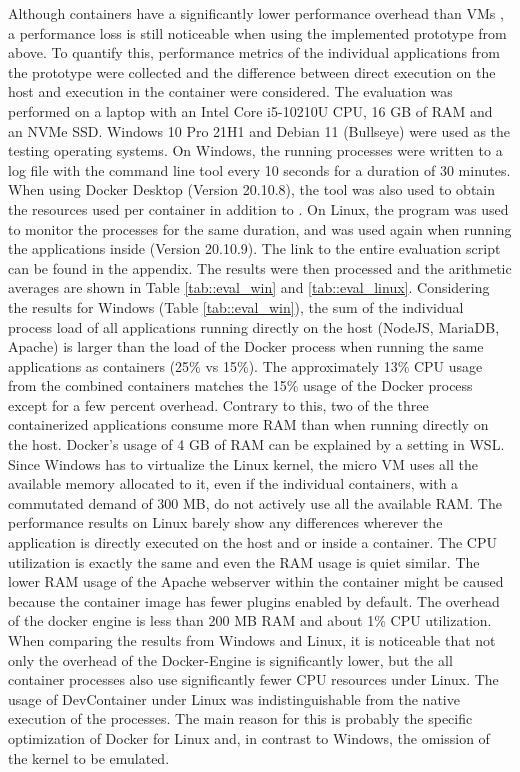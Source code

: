         Although containers have a significantly lower performance overhead than \ac{VM}s \cite{ieee_perfomance}, a performance loss is still noticeable when using the implemented prototype from above. To quantify this, performance metrics of the individual applications from the prototype were collected and the difference between direct execution on the host and execution in the container were considered.\newline
        The evaluation was performed on a laptop with an Intel Core i5-10210U CPU, 16 GB of RAM and an NVMe SSD. Windows 10 Pro 21H1 and Debian 11 (Bullseye) were used as the testing operating systems. On Windows, the running processes were written to a log file with the command line tool  every 10 seconds for a duration of 30 minutes. When using Docker Desktop (Version 20.10.8), the tool  was also used to obtain the resources used per container in addition to . On Linux, the  program was used to monitor the processes for the same duration, and  was used again when running the applications inside  (Version 20.10.9). The link to the entire evaluation script can be found in the appendix. The results were then processed and the arithmetic averages are shown in Table \ref{tab::eval_win} and \ref{tab::eval_linux}.\newline
        Considering the results for Windows (Table \ref{tab::eval_win}), the sum of the individual process load of all applications running directly on the host (NodeJS, MariaDB, Apache) is larger than the load of the Docker process when running the same applications as containers (25\% vs 15\%). The approximately 13\% CPU usage from the combined containers matches the 15\% usage of the Docker process except for a few percent overhead. Contrary to this, two of the three containerized applications consume more RAM than when running directly on the host. Docker's usage of 4 GB of RAM can be explained by a setting in \ac{WSL}. Since Windows has to virtualize the Linux kernel, the micro \ac{VM} uses all the available memory allocated to it, even if the individual containers, with a commutated demand of 300 MB, do not actively use all the available RAM.\newline
        The performance results on Linux barely show any differences wherever the application is directly executed on the host and or inside a container. The CPU utilization is exactly the same and even the RAM usage is quiet similar. The lower RAM usage of the Apache webserver within the container might be caused because the container image has fewer plugins enabled by default. The overhead of the docker engine is less than 200 MB RAM and about 1\% CPU utilization. When comparing the results from Windows and Linux, it is noticeable that not only the overhead of the Docker-Engine is significantly lower, but the all container processes also use significantly fewer CPU resources under Linux. The usage of DevContainer under Linux was indistinguishable from the native execution of the processes. The main reason for this is probably the specific optimization of Docker for Linux and, in contrast to Windows, the omission of the kernel to be emulated.\newline
